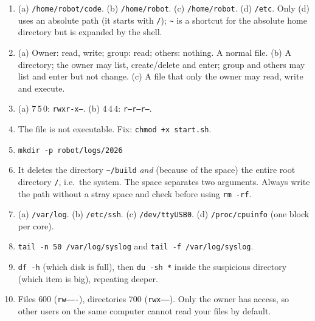 \begin{enumerate}[label=\textbf{\ansnum.\arabic*}]
  \item (a) \texttt{/home/robot/code}. (b) \texttt{/home/robot}. (c) \texttt{/home/robot}. (d) \texttt{/etc}. Only (d) uses an absolute path (it starts with \texttt{/}); \verb|~| is a shortcut for the absolute home directory but is expanded by the shell.
  \item (a) Owner: read, write; group: read; others: nothing. A normal file. (b) A directory; the owner may list, create/delete and enter; group and others may list and enter but not change. (c) A file that only the owner may read, write and execute.
  \item (a) $7\,5\,0$: \texttt{rwxr-x---}. (b) $4\,4\,4$: \texttt{r--r--r--}.
  \item The file is not executable. Fix: \verb|chmod +x start.sh|.
  \item \verb|mkdir -p robot/logs/2026|
  \item It deletes the directory \texttt{\textasciitilde/build} \emph{and} (because of the space) the entire root directory \texttt{/}, i.e.\ the system. The space separates two arguments. Always write the path without a stray space and check before using \texttt{rm -rf}.
  \item (a) \texttt{/var/log}. (b) \texttt{/etc/ssh}. (c) \texttt{/dev/ttyUSB0}. (d) \texttt{/proc/cpuinfo} (one block per core).
  \item \verb|tail -n 50 /var/log/syslog| and \verb|tail -f /var/log/syslog|.
  \item \verb|df -h| (which disk is full), then \verb|du -sh *| inside the suspicious directory (which item is big), repeating deeper.
  \item Files $600$ (\texttt{rw-------}), directories $700$ (\texttt{rwx------}). Only the owner has access, so other users on the same computer cannot read your files by default.
\end{enumerate}
